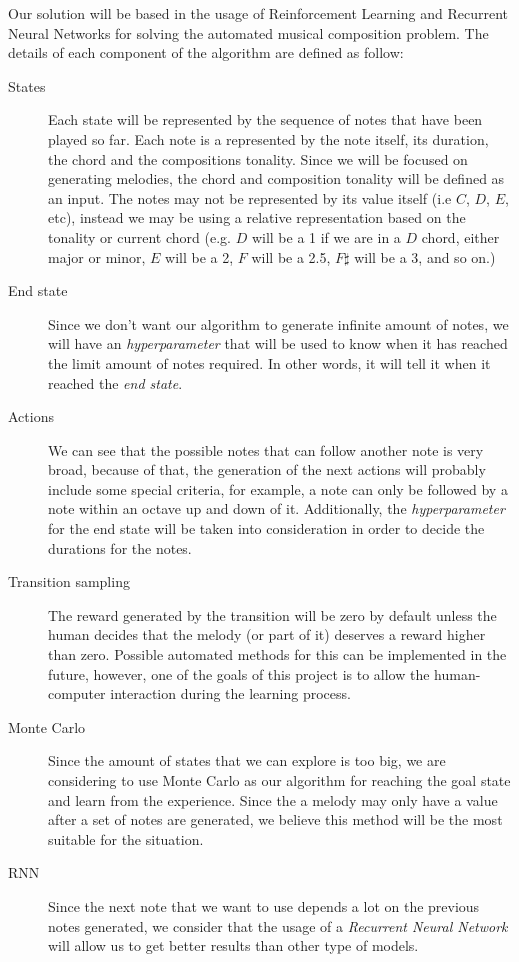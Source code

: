 Our solution will be based in the usage of Reinforcement Learning and Recurrent Neural Networks for solving the automated musical composition problem. The details of each component of the algorithm are defined as follow:

\begin{description}
  \item [States] Each state will be represented by the sequence of notes that have been played so far. Each note is a represented by the note itself, its duration, the chord and the compositions tonality. Since we will be focused on generating melodies, the chord and composition tonality will be defined as an input. The notes may not be represented by its value itself (i.e $ C $, $D$, $E$, etc), instead we may be using a relative representation based on the tonality or current chord (e.g. $ D $ will be a 1 if we are in a $ D $ chord, either major or minor, $ E $ will be a 2, $ F $ will be a 2.5, $ F\sharp $ will be a 3, and so on.)
  \item [End state] Since we don't want our algorithm to generate infinite amount of notes, we will have an \emph{hyperparameter} that will be used to know when it has reached the limit amount of notes required. In other words, it will tell it when it reached the \emph{end state}.
  \item [Actions] We can see that the possible notes that can follow another note is very broad, because of that, the generation of the next actions will probably include some special criteria, for example, a note can only be followed by a note within an octave up and down of it. Additionally, the \emph{hyperparameter} for the end state will be taken into consideration in order to decide the durations for the notes.
  \item [Transition sampling] The reward generated by the transition will be zero by default unless the human decides that the melody (or part of it) deserves a reward higher than zero. Possible automated methods for this can be implemented in the future, however, one of the goals of this project is to allow the human-computer interaction during the learning process.
  \item [Monte Carlo] Since the amount of states that we can explore is too big, we are considering to use Monte Carlo as our algorithm for reaching the goal state and learn from the experience. Since the a melody may only have a value after a set of notes are generated, we believe this method will be the most suitable for the situation.
  \item [RNN] Since the next note that we want to use depends a lot on the previous notes generated, we consider that the usage of a \emph{Recurrent Neural Network} will allow us to get better results than other type of models.
\end{description}

